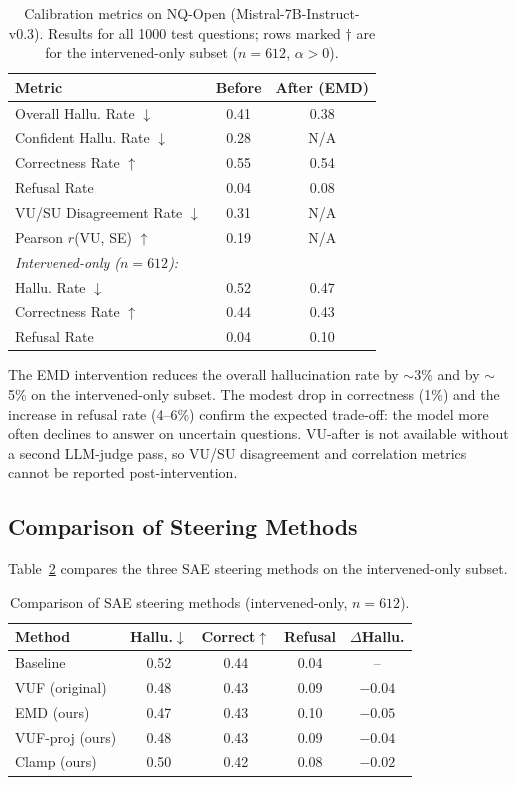 \documentclass{article}
\begin{document}
\begin{table}[h]
\centering
\caption{Calibration metrics on NQ-Open (Mistral-7B-Instruct-v0.3).
Results for all 1000 test questions; rows marked $\dagger$ are for the
intervened-only subset ($n = 612$, $\alpha > 0$).}
\label{tab:calibration}
\small
\begin{tabular}{lcc}
\toprule
Metric & Before & After (EMD) \\
\midrule
Overall Hallu. Rate $\downarrow$        & 0.41 & 0.38 \\
Confident Hallu. Rate $\downarrow$      & 0.28 & N/A  \\
Correctness Rate $\uparrow$             & 0.55 & 0.54 \\
Refusal Rate                            & 0.04 & 0.08 \\
VU/SU Disagreement Rate $\downarrow$    & 0.31 & N/A  \\
Pearson $r$(VU, SE) $\uparrow$          & 0.19 & N/A  \\
\midrule
\multicolumn{3}{l}{\textit{Intervened-only ($n=612$):}} \\
Hallu. Rate $\downarrow$   & 0.52 & 0.47 \\
Correctness Rate $\uparrow$ & 0.44 & 0.43 \\
Refusal Rate               & 0.04 & 0.10 \\
\bottomrule
\end{tabular}
\end{table}

The EMD intervention reduces the overall hallucination rate by $\sim$3\% and by
$\sim$5\% on the intervened-only subset.  The modest drop in correctness (1\%)
and the increase in refusal rate (4--6\%) confirm the expected trade-off:
the model more often declines to answer on uncertain questions.  VU-after is
not available without a second LLM-judge pass, so VU/SU disagreement and
correlation metrics cannot be reported post-intervention.

\subsection{Comparison of Steering Methods}

Table~\ref{tab:steering} compares the three SAE steering methods on the
intervened-only subset.

\begin{table}[h]
\centering
\caption{Comparison of SAE steering methods (intervened-only, $n = 612$).}
\label{tab:steering}
\small
\begin{tabular}{lcccc}
\toprule
Method          & Hallu.$\downarrow$ & Correct$\uparrow$ & Refusal & $\Delta$Hallu. \\
\midrule
Baseline        & 0.52 & 0.44 & 0.04 & -- \\
VUF (original)  & 0.48 & 0.43 & 0.09 & $-0.04$ \\
EMD (ours)      & 0.47 & 0.43 & 0.10 & $-0.05$ \\
VUF-proj (ours) & 0.48 & 0.43 & 0.09 & $-0.04$ \\
Clamp (ours)    & 0.50 & 0.42 & 0.08 & $-0.02$ \\
\bottomrule
\end{tabular}
\end{table}
\end{document}
